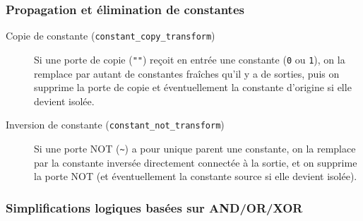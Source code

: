 \documentclass[a4paper,12pt]{article}
\begin{document}
\subsubsection{Propagation et élimination de constantes}

\begin{description}
    \item[Copie de constante (\texttt{constant\_copy\_transform})]
    Si une porte de copie (\texttt{""}) reçoit en entrée une constante (\texttt{0} ou \texttt{1}), on la remplace par autant de constantes fraîches qu’il y a de sorties, puis on supprime la porte de copie et éventuellement la constante d’origine si elle devient isolée.

    \item[Inversion de constante (\texttt{constant\_not\_transform})]
    Si une porte NOT (\texttt{\textasciitilde}) a pour unique parent une constante, on la remplace par la constante inversée directement connectée à la sortie, et on supprime la porte NOT (et éventuellement la constante source si elle devient isolée).
\end{description}

\subsubsection{Simplifications logiques basées sur AND/OR/XOR}
\end{document}
